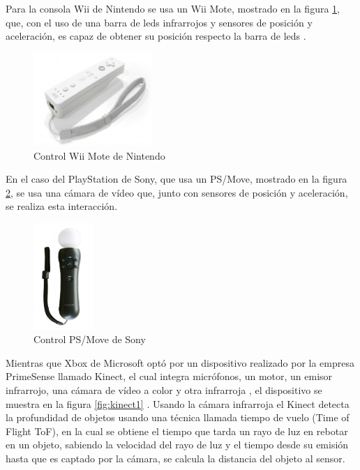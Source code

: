 Para la consola Wii de Nintendo se usa un Wii Mote, mostrado en la figura \ref{fig:WiiMote}, que, con el uso de una barra de leds infrarrojos y sensores de posición y aceleración, es capaz de obtener su posición respecto la barra de leds \cite{UsodelKi56:online}.\\
\begin{figure}[!htb]
	\centering
	\includegraphics[width=0.4\textwidth]{01Introduccion/imagenes/wiiMote.JPG}
	\caption{Control Wii Mote de Nintendo} 
	\label{fig:WiiMote}
\end{figure}


En el caso del PlayStation de Sony, que usa un PS/Move, mostrado en la figura \ref{fig:psMove}, se usa una cámara de vídeo que, junto con sensores de posición y aceleración, se realiza esta interacción.\\

\begin{figure}[!htb]
	\centering
	\includegraphics[width=0.2\textwidth]{01Introduccion/imagenes/PsMove.JPG}
	\caption{Control PS/Move de Sony} 
	\label{fig:psMove}
\end{figure}

Mientras que Xbox de Microsoft optó por un dispositivo realizado por la empresa PrimeSense llamado Kinect, el cual integra micrófonos, un motor, un emisor infrarrojo, una cámara de vídeo a color y otra infrarroja \cite{UsodelKi56:online}, el dispositivo se muestra en la figura \ref{fig:kinect1} \cite{Microsof29:online}. Usando la cámara infrarroja el Kinect detecta la profundidad de objetos usando una técnica llamada tiempo de vuelo (Time of Flight ToF), en la cual se obtiene el tiempo que tarda un rayo de luz en rebotar en un objeto, sabiendo la velocidad del rayo de luz y el tiempo desde su emisión hasta que es captado por la cámara, se calcula la distancia del objeto al sensor\cite{Lachat2015}.\\

